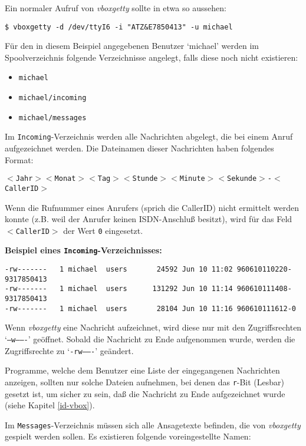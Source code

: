 Ein normaler Aufruf von {\em vboxgetty\/} sollte in etwa so aussehen:

{\tt \$ vboxgetty -d /dev/ttyI6 -i "ATZ\&E7850413" -u michael}

F\"{u}r den in diesem Beispiel angegebenen Benutzer `michael' werden im
Spoolverzeichnis folgende Verzeichnisse angelegt, falls diese noch nicht
existieren:

\begin{itemize}
\item {\tt michael}
\item {\tt michael/incoming}
\item {\tt michael/messages}
\end{itemize}


Im {\tt Incoming}-Verzeichnis werden alle Nachrichten abgelegt, die bei
einem Anruf aufgezeichnet werden. Die Dateinamen dieser Nachrichten haben
folgendes Format:

{\tt {\(<\)}Jahr{\(>\)}{\(<\)}Monat{\(>\)}{\(<\)}Tag{\(>\)}{\(<\)}Stunde{\(>\)}{\(<\)}Minute{\(>\)}{\(<\)}Sekunde{\(>\)}-{\(<\)}CallerID{\(>\)}}

Wenn die Rufnummer eines Anrufers (sprich die CallerID) nicht ermittelt
werden konnte (z.B. weil der Anrufer keinen ISDN-Anschlu{\ss} besitzt), wird f\"{u}r
das Feld {\tt {\(<\)}CallerID{\(>\)}} der Wert {\tt 0} eingesetzt.

{\bf Beispiel eines {\tt Incoming}-Verzeichnisses:}

\begin{verbatim}
-rw-------   1 michael  users       24592 Jun 10 11:02 960610110220-9317850413
-rw-------   1 michael  users      131292 Jun 10 11:14 960610111408-9317850413
-rw-------   1 michael  users       28104 Jun 10 11:16 960610111612-0
\end{verbatim}


Wenn {\em vboxgetty\/} eine Nachricht aufzeichnet, wird diese nur mit den
Zugriffsrechten `{\tt --w-------}' ge\"{o}ffnet. Sobald die Nachricht zu Ende
aufgenommen wurde, werden die Zugriffsrechte zu `{\tt -rw-------}'
ge\"{a}ndert.

Programme, welche dem Benutzer eine Liste der eingegangenen Nachrichten
anzeigen, sollten nur solche Dateien aufnehmen, bei denen das {\tt r}-Bit
(Lesbar) gesetzt ist, um sicher zu sein, da{\ss} die Nachricht zu Ende
aufgezeichnet wurde (siehe Kapitel \ref{id-vbox}).

Im {\tt Messages}-Verzeichnis m\"{u}ssen sich alle Ansagetexte befinden, die
von {\em vboxgetty\/} gespielt werden sollen. Es existieren folgende
voreingestellte Namen:

